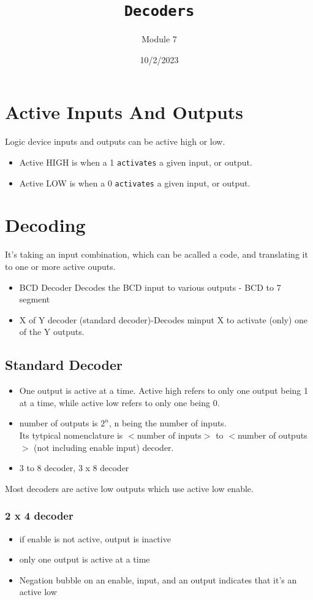 \documentclass[a4paper,12pt]{article}
\title{\texttt{Decoders}\\\hrulefill}
\author{Module 7}
\date{\small{10/2/2023}}
\begin{document}
    \maketitle

    \section{Active Inputs And Outputs}
      Logic device inputs and outputs can be active high or low.
        \begin{itemize}
          \item Active HIGH is when a 1 \texttt{activates} a given input, or output.
          \item Active LOW is when a 0 \texttt{activates} a given input, or output.
        \end{itemize}
    
    \section{Decoding}
      It's taking an input combination, which can be acalled a code, and translating it to one or more active ouputs. 
      \begin{itemize}
        \item BCD Decoder Decodes the BCD input to various outputs - BCD to 7 segment
        \item X of Y decoder (standard decoder)-Decodes minput X to activate (only) one of the Y outputs.
      \end{itemize}
      \subsection{Standard Decoder}
        \begin{itemize}
          \item One output is active at a time. Active high refers to only one output being 1 at a time, while active low refers to only one being 0.
          \item number of outputs is $2^n$, n being the number of inputs. \\
          Its tytpical nomenclature is $<$number of inputs$>$ to $<$number of outputs$>$ (not including enable input) decoder.
          \item 3 to 8 decoder, 3 x 8 decoder
        \end{itemize}
        Most decoders are active low outputs which use active low enable.

        \subsubsection*{2 x 4 decoder}
          \begin{itemize}
            \item if enable is not active, output is inactive
            \item only one output is active at a time
            \item Negation bubble on an enable, input, and an output indicates that it's an active low
          \end{itemize}
\end{document}
